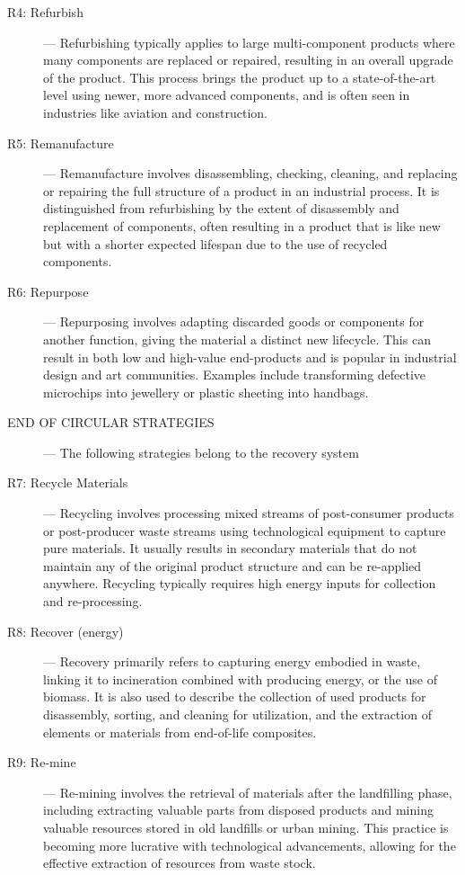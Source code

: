 \begin{description}
    \item[R4: Refurbish] — Refurbishing typically applies to large multi-component products where many components are replaced or repaired, resulting in an overall upgrade of the product. This process brings the product up to a state-of-the-art level using newer, more advanced components, and is often seen in industries like aviation and construction.

    \item[R5: Remanufacture] — Remanufacture involves disassembling, checking, cleaning, and replacing or repairing the full structure of a product in an industrial process. It is distinguished from refurbishing by the extent of disassembly and replacement of components, often resulting in a product that is like new but with a shorter expected lifespan due to the use of recycled components.

    \item[R6: Repurpose] — Repurposing involves adapting discarded goods or components for another function, giving the material a distinct new lifecycle. This can result in both low and high-value end-products and is popular in industrial design and art communities. Examples include transforming defective microchips into jewellery or plastic sheeting into handbags.

    \item[END OF CIRCULAR STRATEGIES] — The following strategies belong to the recovery system

    \item[R7: Recycle Materials] — Recycling involves processing mixed streams of post-consumer products or post-producer waste streams using technological equipment to capture pure materials. It usually results in secondary materials that do not maintain any of the original product structure and can be re-applied anywhere. Recycling typically requires high energy inputs for collection and re-processing.

    \item[R8: Recover (energy)] — Recovery primarily refers to capturing energy embodied in waste, linking it to incineration combined with producing energy, or the use of biomass. It is also used to describe the collection of used products for disassembly, sorting, and cleaning for utilization, and the extraction of elements or materials from end-of-life composites.

    \item[R9: Re-mine] — Re-mining involves the retrieval of materials after the landfilling phase, including extracting valuable parts from disposed products and mining valuable resources stored in old landfills or urban mining. This practice is becoming more lucrative with technological advancements, allowing for the effective extraction of resources from waste stock.
\end{description}

